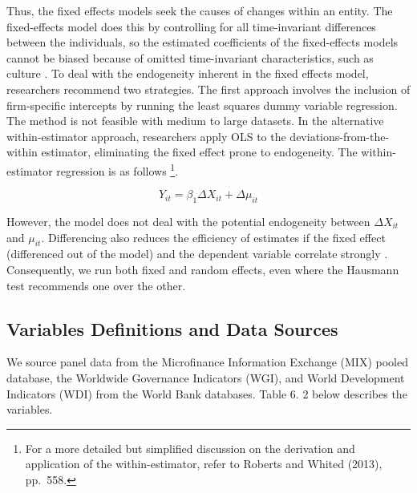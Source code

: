 \documentclass[a4paper, nobind]{templates/ociamthesis}
\begin{document}
Thus, the fixed effects models seek the causes of changes within an entity. The fixed-effects model does this by controlling for all time-invariant differences between the individuals, so the estimated coefficients of the fixed-effects models cannot be biased because of omitted time-invariant characteristics, such as culture \autocite{torres2007panel}. To deal with the endogeneity inherent in the fixed effects model, researchers recommend two strategies. The first approach involves the inclusion of firm-specific intercepts by running the least squares dummy variable regression. The method is not feasible with medium to large datasets. In the alternative within-estimator approach, researchers apply OLS to the deviations-from-the-within estimator, eliminating the fixed effect prone to endogeneity. The within-estimator regression is as follows \footnote{For a more detailed but simplified discussion on the derivation and application of the within-estimator, refer to Roberts and Whited (2013), pp.~558.}.

\begin{equation}
Y_{it} = \beta_{1} \Delta X_{it} + \Delta \mu_{it}
\end{equation}

However, the model does not deal with the potential endogeneity between \(\Delta X_{it}\) and \(\mu_{it}\). Differencing also reduces the efficiency of estimates if the fixed effect (differenced out of the model) and the dependent variable correlate strongly \autocite{clark2015should}. Consequently, we run both fixed and random effects, even where the Hausmann test recommends one over the other.

\hypertarget{variables-definitions-and-data-sources}{%
\subsection{Variables Definitions and Data Sources}\label{variables-definitions-and-data-sources}}

We source panel data from the Microfinance Information Exchange (MIX) pooled database, the Worldwide Governance Indicators (WGI), and World Development Indicators (WDI) from the World Bank databases. Table 6. 2 below describes the variables.

\begingroup\fontsize{9}{11}\selectfont
\end{document}
